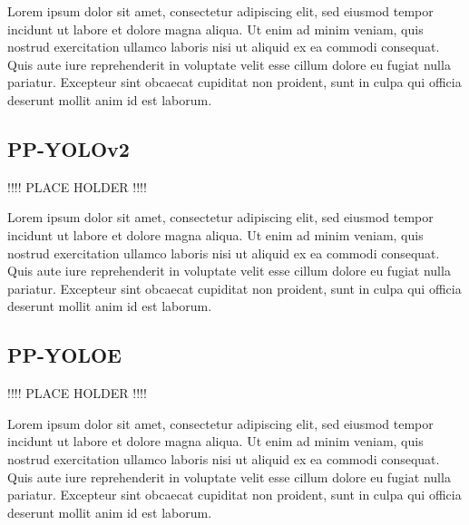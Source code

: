 \documentclass{article}
\begin{document}
Lorem ipsum dolor sit amet, consectetur adipiscing elit, sed eiusmod tempor incidunt ut labore et dolore magna aliqua. Ut enim ad minim veniam, quis nostrud exercitation ullamco laboris nisi ut aliquid ex ea commodi consequat. Quis aute iure reprehenderit in voluptate velit esse cillum dolore eu fugiat nulla pariatur. Excepteur sint obcaecat cupiditat non proident, sunt in culpa qui officia deserunt mollit anim id est laborum.

\subsection{PP-YOLOv2}

!!!! PLACE HOLDER !!!!


Lorem ipsum dolor sit amet, consectetur adipiscing elit, sed eiusmod tempor incidunt ut labore et dolore magna aliqua. Ut enim ad minim veniam, quis nostrud exercitation ullamco laboris nisi ut aliquid ex ea commodi consequat. Quis aute iure reprehenderit in voluptate velit esse cillum dolore eu fugiat nulla pariatur. Excepteur sint obcaecat cupiditat non proident, sunt in culpa qui officia deserunt mollit anim id est laborum.


\subsection{PP-YOLOE}

!!!! PLACE HOLDER !!!!


Lorem ipsum dolor sit amet, consectetur adipiscing elit, sed eiusmod tempor incidunt ut labore et dolore magna aliqua. Ut enim ad minim veniam, quis nostrud exercitation ullamco laboris nisi ut aliquid ex ea commodi consequat. Quis aute iure reprehenderit in voluptate velit esse cillum dolore eu fugiat nulla pariatur. Excepteur sint obcaecat cupiditat non proident, sunt in culpa qui officia deserunt mollit anim id est laborum.




\end{document}
